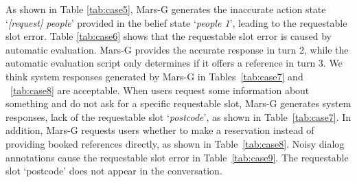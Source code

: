 As shown in Table \ref{tab:case5},  Mars-G generates the inaccurate action state `\textit{[request] people}' provided in the belief state `\textit{people 1}', leading to the requestable slot error. 
Table \ref{tab:case6} shows that the requestable slot error is caused by automatic evaluation.
Mars-G provides the accurate response in turn 2, while the automatic evaluation script only determines if it offers a reference in turn 3.
We think system responses generated by Mars-G in Tables~\ref{tab:case7} and ~\ref{tab:case8} are acceptable.
When users request some information about something and do not ask for a specific requestable slot, Mars-G generates system responses, lack of the  requestable slot `\textit{postcode}', as shown in Table~\ref{tab:case7}. In addition, Mars-G requests users whether to make a reservation instead of providing booked references directly, as shown in Table~\ref{tab:case8}.
Noisy dialog annotations cause the requestable slot error in Table~\ref{tab:case9}. The requestable slot `postcode' does not appear in the conversation.
 
